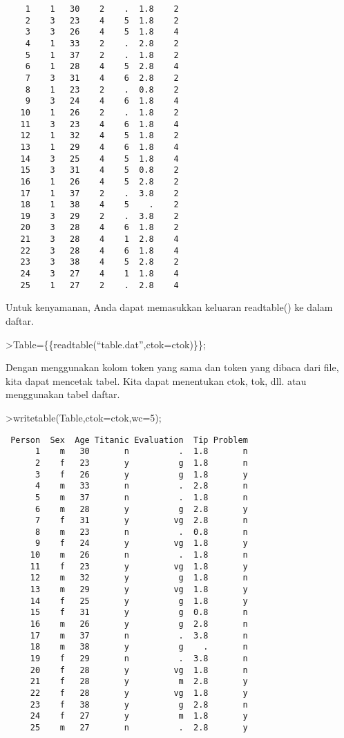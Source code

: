 \documentclass[
]{book}
\begin{document}
\begin{verbatim}
    1    1   30    2    .  1.8    2
    2    3   23    4    5  1.8    2
    3    3   26    4    5  1.8    4
    4    1   33    2    .  2.8    2
    5    1   37    2    .  1.8    2
    6    1   28    4    5  2.8    4
    7    3   31    4    6  2.8    2
    8    1   23    2    .  0.8    2
    9    3   24    4    6  1.8    4
   10    1   26    2    .  1.8    2
   11    3   23    4    6  1.8    4
   12    1   32    4    5  1.8    2
   13    1   29    4    6  1.8    4
   14    3   25    4    5  1.8    4
   15    3   31    4    5  0.8    2
   16    1   26    4    5  2.8    2
   17    1   37    2    .  3.8    2
   18    1   38    4    5    .    2
   19    3   29    2    .  3.8    2
   20    3   28    4    6  1.8    2
   21    3   28    4    1  2.8    4
   22    3   28    4    6  1.8    4
   23    3   38    4    5  2.8    2
   24    3   27    4    1  1.8    4
   25    1   27    2    .  2.8    4
\end{verbatim}

Untuk kenyamanan, Anda dapat memasukkan keluaran readtable() ke dalam daftar.

\textgreater Table=\{\{readtable(``table.dat'',ctok=ctok)\}\};

Dengan menggunakan kolom token yang sama dan token yang dibaca dari file, kita dapat mencetak tabel. Kita dapat menentukan ctok, tok, dll. atau menggunakan tabel daftar.

\textgreater writetable(Table,ctok=ctok,wc=5);

\begin{verbatim}
 Person  Sex  Age Titanic Evaluation  Tip Problem
      1    m   30       n          .  1.8       n
      2    f   23       y          g  1.8       n
      3    f   26       y          g  1.8       y
      4    m   33       n          .  2.8       n
      5    m   37       n          .  1.8       n
      6    m   28       y          g  2.8       y
      7    f   31       y         vg  2.8       n
      8    m   23       n          .  0.8       n
      9    f   24       y         vg  1.8       y
     10    m   26       n          .  1.8       n
     11    f   23       y         vg  1.8       y
     12    m   32       y          g  1.8       n
     13    m   29       y         vg  1.8       y
     14    f   25       y          g  1.8       y
     15    f   31       y          g  0.8       n
     16    m   26       y          g  2.8       n
     17    m   37       n          .  3.8       n
     18    m   38       y          g    .       n
     19    f   29       n          .  3.8       n
     20    f   28       y         vg  1.8       n
     21    f   28       y          m  2.8       y
     22    f   28       y         vg  1.8       y
     23    f   38       y          g  2.8       n
     24    f   27       y          m  1.8       y
     25    m   27       n          .  2.8       y
\end{verbatim}
\end{document}
